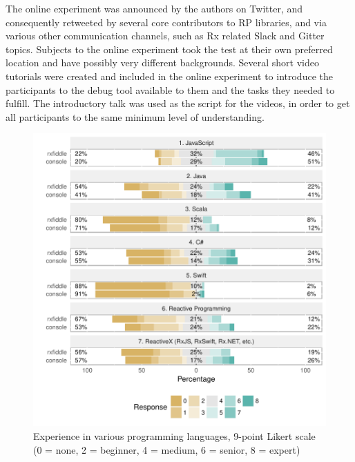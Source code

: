 The online experiment was announced by the authors on Twitter, and consequently retweeted by several core contributors to RP libraries, and via various other communication channels, such as Rx related Slack and Gitter topics. 
Subjects to the online experiment took the test at their own preferred location and have possibly very different backgrounds. Several short video tutorials were created and included in the online experiment to introduce the participants to the debug tool available to them and the tasks they needed to fulfill. The introductory talk was used as the script for the videos, in order to get all participants to the same minimum level of understanding.

\begin{figure}[t]
\includegraphics[width=\columnwidth]{images/experience.pdf}
\caption{Experience in various programming languages, 9-point Likert scale (0 = none, 2 = beginner, 4 = medium, 6 = senior, 8 = expert)}
\label{fig-experience}
\end{figure}
